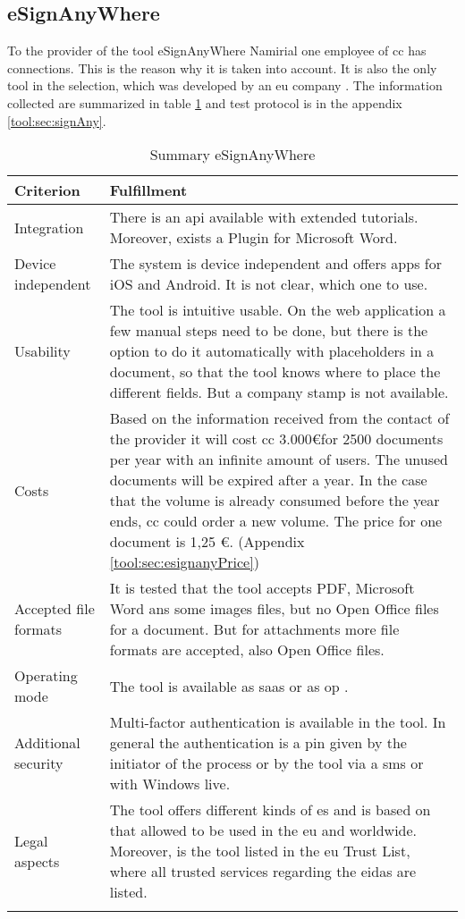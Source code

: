 \subsection{eSignAnyWhere}
To the provider of the tool eSignAnyWhere Namirial one employee of \gls{cc} has connections. This is the reason why it is taken into account. It is also the only tool in the selection, which was developed by an \gls{eu} company \parencite{signAny2018contact}. The information collected are summarized in table \ref{tool:tab:esignany} and test protocol is in the appendix \ref{tool:sec:signAny}. \newpage
	\begin{longtable}{|p{4cm}|p{10cm}|} \hline
		\rowcolor{Gray}Criterion & Fulfillment \\ \hline
		Integration & There is an \gls{api} available with extended tutorials. Moreover, exists a Plugin for Microsoft Word. \parencite{signAny2018api, signAny2018dev,signAny2018guide} \\ \hline
		Device independent & The system is device independent and offers \glspl{app} for iOS and Android. It is not clear, which one to use. \parencite{signAny2018info} \\ \hline
		Usability & The tool is intuitive usable. On the web application a few manual steps need to be done, but there is the option to do it automatically with placeholders in a document, so that the tool knows where to place the different fields. But a company stamp is not available. \parencite{signAny2018guide} \\ \hline
		Costs & Based on the information received from the contact of the provider it will cost \gls{cc} 3.000\euro for 2500 documents per year with an infinite amount of users. The unused documents will be expired after a year. In the case that the volume is already consumed before the year ends, \gls{cc} could order a new volume. The price for one document is 1,25 \euro. (Appendix \ref{tool:sec:esignanyPrice}) \\ \hline
		Accepted file formats & It is tested that the tool accepts \gls{PDF}, Microsoft Word ans some images files, but no Open Office files for a document. But for attachments more file formats are accepted, also Open Office files. \\ \hline
		Operating mode &  The tool is available as \gls{saas} or as \gls{op} \parencite{signAny2018business}. \\ \hline
		Additional security & Multi-factor authentication is available in the tool. In general the authentication is a pin given by the initiator of the process or by the tool via a \gls{sms} or with Windows live. \parencite{signAny2018sign} \\ \hline
		Legal aspects & The tool offers different kinds of \gls{es} and is based on that allowed to be used in the \gls{eu} and worldwide. Moreover, is the tool listed in the \gls{eu} Trust List, where all trusted services regarding the \gls{eidas} are listed. \parencite{signAny2018sign,signAny2018trust} \\ \hline
	\caption{Summary eSignAnyWhere}
	\label{tool:tab:esignany}
	\end{longtable}
